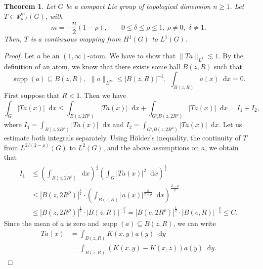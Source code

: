 \documentclass[12pt, reqno]{amsart}
\newtheorem{theorem}{Theorem}[section]
\theoremstyle{definition}
\theoremstyle{remark}
\numberwithin{equation}{section}
\newcommand*\diff{\mathop{}\!\mathrm{d}}
\begin{document}
\begin{theorem}\label{H1:L1}
    Let $G$ be a compact Lie group of topological dimension $n\geq 1$. Let $T\in\Psi^{m}_{\rho,\delta}(G)$, with \[
m = -\frac{n}{2}(1-\rho),
\qquad 0 \le \delta \le \rho \le 1,\ \rho\neq0,\;\delta \neq 1.
\]
Then, $T$ is a continuous mapping from $H^1(G)$ to $L^{1}(G)$.
\end{theorem}
\begin{proof}
    Let $a$ be an $(1,\infty)$-atom. We have to show that $\|Ta\|_{L^1}\lesssim 1$. By the definition of an atom, we know that there exists some ball $B(z,R)$ such that
    \begin{equation*}
        \operatorname{supp}(a)\subseteq B(z,R),\hspace{5pt}\|a\|_{L^\infty}\leq|B(z,R)|^{-1},\hspace{5pt}\int_{B(z,R)}a(x)\diff{x}=0.
    \end{equation*}
    First suppose that $R<1$. Then we have
    \begin{equation*}
        \int_{G}|Ta(x)|\diff{x}\leq\int_{B(z,2R^\rho)}|Ta(x)|\diff{x}+\int_{G\setminus B(z,2R^\rho)}|Ta(x)|\diff{x}=I_1+I_2,
    \end{equation*}
    where $I_1=\int_{B(z,2R^\rho)}|Ta(x)|\diff{x}$ and $I_2=\int_{G\setminus B(z,2R^\rho)}|Ta(x)|\diff{x}$. Let us estimate both integrals separately. Using H\"older's inequality, the continuity of $T$ from $L^{2/(2-\rho)}(G)$ to $L^{2}(G)$, and the above assumptions on $a$, we obtain that
     \begin{equation*}
        \begin{aligned}
        I_1&\leq\left(\int_{B(z,2R^\rho)}\diff{x}\right)^{\frac{1}{2}}\left(\int_{G}|Ta(x)|^2\diff{x}\right)^{\frac{1}{2}}\\
        &\leq|B(z,2R^\rho)|^{\frac{1}{2}}\cdot\left(\int_{B(z,R)}|a(x)|^{\frac{2}{2-\rho}}\diff{x}\right)^{\frac{2-\rho}{2}}\\
        &\leq|B(z,2R^\rho)|^{\frac{1}{2}}\cdot|B(z,R)|^{-\frac{\rho}{2}}=|B(e,2R^\rho)|^{\frac{1}{2}}\cdot|B(e,R)|^{-\frac{\rho}{2}}\leq C.
    \end{aligned}
    \end{equation*}
    Since the mean of $a$ is zero and $\operatorname{supp}(a)\subseteq B(z,R)$, we can write
   \begin{equation*}
    \begin{aligned}
        Ta(x)&=\int_{B(z,R)}K(x,y)a(y)\diff{y}\\
        &=\int_{B(z,R)}(K(x,y)-K(x,z))a(y)\diff{y}.

\end{aligned}
\end{equation*}
\end{proof}
\end{document}
